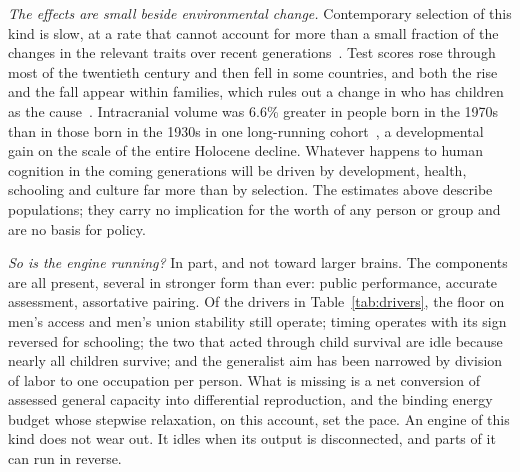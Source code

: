 \emph{The effects are small beside environmental change.} Contemporary selection of this kind is slow, at a rate that cannot
account for more than a small fraction of the changes in the relevant traits over recent generations~\cite{beauchamp2016}.
Test scores rose through most of the twentieth century and then fell in some countries, and both the rise and the fall
appear within families, which rules out a change in who has children as the cause~\cite{bratsberg2018}. Intracranial volume
was 6.6\% greater in people born in the 1970s than in those born in the 1930s in one long-running cohort~\cite{decarli2024}, a
developmental gain on the scale of the entire Holocene decline. Whatever happens to human cognition in the coming
generations will be driven by development, health, schooling and culture far more than by selection. The estimates above
describe populations; they carry no implication for the worth of any person or group and are no basis for policy.

\emph{So is the engine running?} In part, and not toward larger brains. The components are all present, several in stronger
form than ever: public performance, accurate assessment, assortative pairing. Of the drivers in Table~\ref{tab:drivers}, the
floor on men's access and men's union stability still operate; timing operates with its sign reversed for schooling; the two
that acted through child survival are idle because nearly all children survive; and the generalist aim has been narrowed by
division of labor to one occupation per person. What is missing is a net conversion of assessed general capacity into
differential reproduction, and the binding energy budget whose stepwise relaxation, on this account, set the pace. An engine
of this kind does not wear out. It idles when its output is disconnected, and parts of it can run in reverse.

